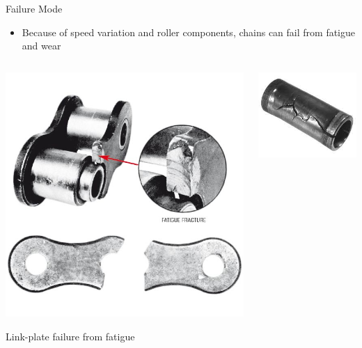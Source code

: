 \documentclass[10pt, svgnames]{beamer}
\begin{document}
\begin{frame}[label={sec:orgd3362c8}]{Failure Mode}
\begin{itemize}
\item Because of speed variation and roller components, chains can fail from fatigue and wear
\end{itemize}

\begin{columns}
\begin{column}{0.5\columnwidth}
\begin{center}
\includegraphics[width=.9\linewidth]{./pictures/link-plate-failure.jpg}
\end{center}

Link-plate failure from fatigue
\end{column}

\begin{column}{0.5\columnwidth}
\begin{center}
\includegraphics[width=.9\linewidth]{./pictures/roller-wear.jpg}
\end{center}


\end{column}
\end{columns}
\end{frame}
\end{document}
